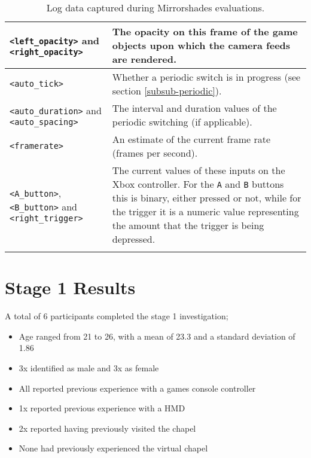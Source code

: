 \begin{center}
\begin{longtable}{ l  p{6.5cm} }
\midrule

\texttt{<left\_opacity>} and \texttt{<right\_opacity>} & The opacity on this frame of the game objects upon which the camera feeds are rendered. \\

\midrule

\texttt{<auto\_tick>} & Whether a periodic switch is in progress (see section \ref{subsub-periodic}). \\

\midrule

\texttt{<auto\_duration>} and \texttt{<auto\_spacing>} & The interval and duration values of the periodic switching (if applicable). \\

\midrule

\texttt{<framerate>} & An estimate of the current frame rate (frames per second). \\

\midrule

\texttt{<A\_button>}, \texttt{<B\_button>} and \texttt{<right\_trigger>} & The current values of these inputs on the Xbox controller. For the \texttt{A} and \texttt{B} buttons this is binary, either pressed or not, while for the trigger it is a numeric value representing the amount that the trigger is being depressed. \\

\bottomrule
\caption{Log data captured during Mirrorshades evaluations.}
\label{logdatatable}
\end{longtable}
\end{center}


\section{Stage 1 Results}

A total of 6 participants completed the stage 1 investigation;
\begin{itemize}
	\item Age ranged from 21 to 26, with a mean of 23.3 and a standard deviation of 1.86
	\item 3x identified as male and 3x as female
	\item All reported previous experience with a games console controller
	\item 1x reported previous experience with a HMD
	\item 2x reported having previously visited the chapel
	\item None had previously experienced the virtual chapel
\end{itemize}


